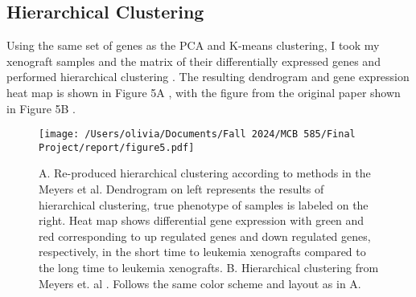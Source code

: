 \documentclass{article}
\begin{document}
\subsection{Hierarchical Clustering}
Using the same set of genes as the PCA and K-means clustering, I took my xenograft samples and the matrix of their differentially expressed genes and performed hierarchical clustering \cite{clustering}. The resulting dendrogram and gene expression heat map is shown in Figure 5A \cite{hclust}, with the figure from the original paper shown in Figure 5B \cite{data}. 

\begin{figure}[H]
    \centering
    \texttt{[image: /Users/olivia/Documents/Fall 2024/MCB 585/Final Project/report/figure5.pdf]}
    \caption{A. Re-produced hierarchical clustering according to methods in the Meyers et al. \cite{data} Dendrogram on left represents the results of hierarchical clustering, true phenotype of samples is labeled on the right. Heat map shows differential gene expression with green and red corresponding to up regulated genes and down regulated genes, respectively, in the short time to leukemia xenografts compared to the long time to leukemia xenografts.
    B. Hierarchical clustering from Meyers et. al \cite{data}. Follows the same color scheme and layout as in A.}
    \label{fig:5}
\end{figure}
\end{document}
